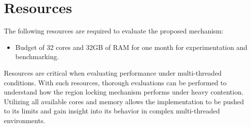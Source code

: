 \section{Resources}
The following resources are required to evaluate the proposed mechanism:
\begin{itemize}
    \item Budget of 32 cores and 32GB of RAM for one month for experimentation and benchmarking.
\end{itemize}
Resources are critical when evaluating performance under multi-threaded conditions. With such resources, thorough evaluations can be performed to understand how the region locking mechanism performs under heavy contention. Utilizing all available cores and memory allows the implementation to be pushed to its limits and gain insight into its behavior in complex multi-threaded environments.
